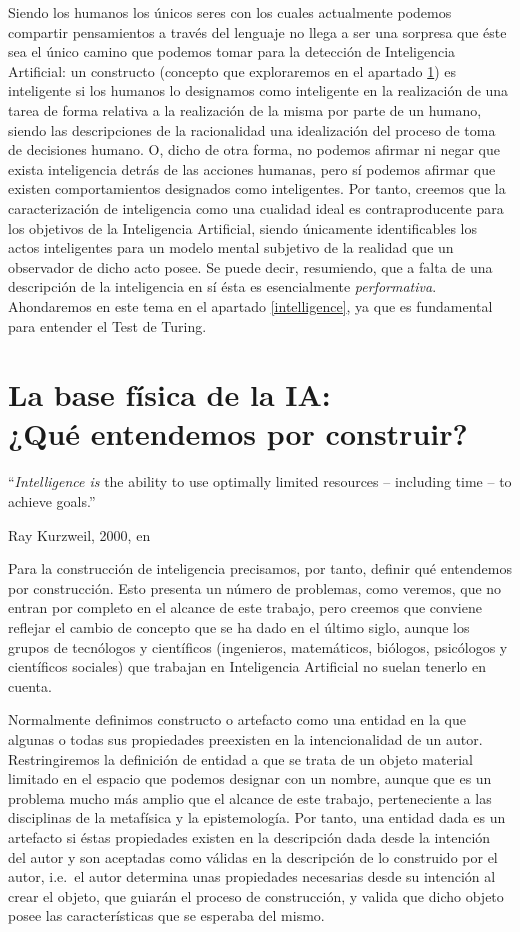 \documentclass[12pt]{memoir}
\begin{document}
Siendo los humanos los únicos seres con los cuales actualmente podemos compartir pensamientos a través del lenguaje no llega a ser una sorpresa que éste sea el único camino que podemos tomar para la detección de Inteligencia Artificial: un constructo (concepto que exploraremos en el apartado \ref{construct}) es inteligente si los humanos lo designamos como inteligente en la realización de una tarea de forma relativa a la realización de la misma por parte de un humano, siendo las descripciones de la racionalidad una idealización del proceso de toma de decisiones humano. O, dicho de otra forma, no podemos afirmar ni negar que exista inteligencia detrás de las acciones humanas, pero sí podemos afirmar que existen comportamientos designados como inteligentes. Por tanto, creemos que la caracterización de inteligencia como una cualidad ideal es contraproducente para los objetivos de la Inteligencia Artificial, siendo únicamente identificables los actos inteligentes para un modelo mental subjetivo de la realidad que un observador de dicho acto posee. Se puede decir, resumiendo, que a falta de una descripción de la inteligencia en sí ésta es esencialmente \textit{performativa}. Ahondaremos en este tema en el apartado \ref{intelligence}, ya que es fundamental para entender el Test de Turing.

\chapter[La base física de la IA: ¿Qué entendemos por construir?]{La base física de la IA: \\ ¿Qué entendemos por construir?}
\label{construct}
\epigraph{``\textit{Intelligence is} the ability to use optimally limited resources – including time – to achieve goals.''}{Ray Kurzweil, 2000, en \parencite{intDefs}}

Para la construcción de inteligencia precisamos, por tanto, definir qué entendemos por construcción. Esto presenta un número de problemas, como veremos, que no entran por completo en el alcance de este trabajo, pero creemos que conviene reflejar el cambio de concepto que se ha dado en el último siglo, aunque los grupos de tecnólogos y científicos (ingenieros, matemáticos, biólogos, psicólogos y científicos sociales) que trabajan en Inteligencia Artificial no suelan tenerlo en cuenta. 

Normalmente definimos constructo o artefacto \parencite{sep-technology, sep-artifact} como una entidad en la que algunas o todas sus propiedades preexisten en la intencionalidad de un autor. Restringiremos la definición de entidad a que se trata de un objeto material limitado en el espacio que podemos designar con un nombre, aunque que es un problema mucho más amplio que el alcance de este trabajo, perteneciente a las disciplinas de la metafísica y la epistemología. Por tanto, una entidad dada es un artefacto si éstas propiedades existen en la descripción dada desde la intención del autor y son aceptadas como válidas en la descripción de lo construido por el autor, i.e.\ el autor determina unas propiedades necesarias desde su intención al crear el objeto, que guiarán el proceso de construcción, y valida que dicho objeto posee las características que se esperaba del mismo.
\end{document}
